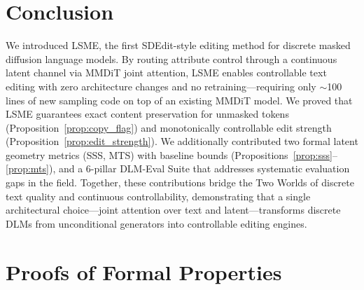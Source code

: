 \documentclass{article}
\begin{document}
\section{Conclusion}
\label{sec:conclusion}

We introduced LSME, the first SDEdit-style editing method for discrete masked diffusion language models.
By routing attribute control through a continuous latent channel via MMDiT joint attention, LSME enables controllable text editing with zero architecture changes and no retraining---requiring only $\sim$100 lines of new sampling code on top of an existing MMDiT model.
We proved that LSME guarantees exact content preservation for unmasked tokens (Proposition~\ref{prop:copy_flag}) and monotonically controllable edit strength (Proposition~\ref{prop:edit_strength}).
We additionally contributed two formal latent geometry metrics (SSS, MTS) with baseline bounds (Propositions~\ref{prop:sss}--\ref{prop:mts}), and a 6-pillar DLM-Eval Suite that addresses systematic evaluation gaps in the field.
Together, these contributions bridge the Two Worlds of discrete text quality and continuous controllability, demonstrating that a single architectural choice---joint attention over text and latent---transforms discrete DLMs from unconditional generators into controllable editing engines.





\newpage
\appendix

\section{Proofs of Formal Properties}
\label{app:proofs}
\end{document}
